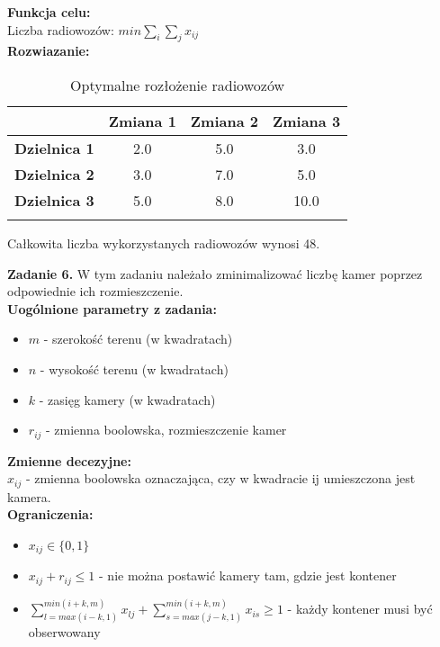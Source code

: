 \documentclass[15pt, a4paper]{article}
\begin{document}
\noindent\textbf{Funkcja celu:}\\

Liczba radiowozów: \(min \sum_{i}\sum_{j}x_{ij} \)\\

\noindent\textbf{Rozwiazanie:}\\ 

\begin{longtable}{|c|c|c|c|}
    \hline
    & \textbf{Zmiana 1} & \textbf{Zmiana 2} & \textbf{Zmiana 3} \\ 
    \hline
    \textbf{Dzielnica 1} & 2.0 & 5.0 & 3.0 \\ 
    \hline
    \textbf{Dzielnica 2} & 3.0 & 7.0 & 5.0 \\ 
    \hline
    \textbf{Dzielnica 3} & 5.0 & 8.0 & 10.0 \\ 
    \hline
\caption{Optymalne rozłożenie radiowozów}
\end{longtable}

Całkowita liczba wykorzystanych radiowozów wynosi 48.

\vspace{0.5cm}

\noindent\hrulefill

\vspace{0.5cm}


\noindent\textbf{Zadanie 6.} W tym zadaniu należało zminimalizować liczbę kamer poprzez odpowiednie ich rozmieszczenie.\\

\noindent\textbf{Uogólnione parametry z zadania:}

\begin{itemize}
    \item \( m \) - szerokość terenu (w kwadratach)
    \item \( n \) - wysokość terenu (w kwadratach)
    \item \( k \) - zasięg kamery (w kwadratach)
    \item \( r_{ij} \) - zmienna boolowska, rozmieszczenie kamer
\end{itemize}

\noindent\textbf{Zmienne decezyjne:}\\

\(x_{ij}\) - zmienna boolowska oznaczająca, czy w kwadracie ij umieszczona jest kamera.\\

\noindent\textbf{Ograniczenia:}

\begin{itemize}
    \item \(x_{ij} \in \{0, 1\} \)
    \item \(x_{ij} + r_{ij} \leq 1 \) - nie można postawić kamery tam, gdzie jest kontener
    \item \(\sum_{l = max(i-k, 1)}^{min(i+k,m)}x_{lj} + \sum_{s = max(j-k, 1)}^{min(i+k,m)}x_{is} \geq 1 \)  - każdy kontener musi być obserwowany
\end{itemize}
\end{document}
